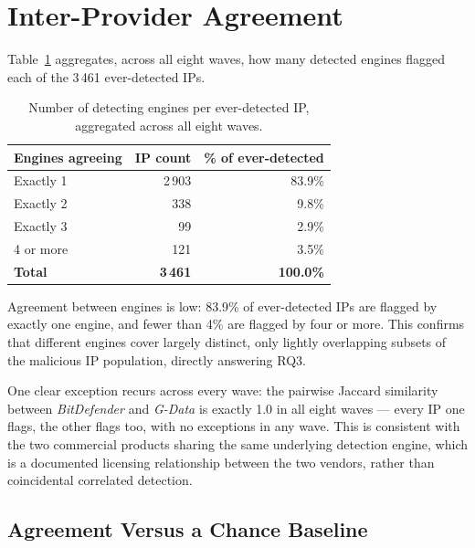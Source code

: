 \documentclass[12pt, a4paper, twoside]{report}
\begin{document}
\section{Inter-Provider Agreement}

Table~\ref{tab:agreement} aggregates, across all eight waves, how many detected engines flagged
each of the 3\,461 ever-detected IPs.

\begin{table}[h]
  \centering
  \caption{Number of detecting engines per ever-detected IP, aggregated across all eight waves.}
  \label{tab:agreement}
  \begin{tabular}{lrr}
    \toprule
    \textbf{Engines agreeing} & \textbf{IP count} & \textbf{\% of ever-detected} \\
    \midrule
    Exactly 1  & 2\,903 & 83.9\% \\
    Exactly 2  & 338    & 9.8\%  \\
    Exactly 3  & 99     & 2.9\%  \\
    4 or more  & 121    & 3.5\%  \\
    \midrule
    \textbf{Total} & \textbf{3\,461} & \textbf{100.0\%} \\
    \bottomrule
  \end{tabular}
\end{table}

Agreement between engines is low: 83.9\% of ever-detected IPs are flagged by exactly one engine,
and fewer than 4\% are flagged by four or more. This confirms that different engines cover largely
distinct, only lightly overlapping subsets of the malicious IP population, directly answering RQ3.

One clear exception recurs across every wave: the pairwise Jaccard similarity between
\emph{BitDefender} and \emph{G-Data} is exactly 1.0 in all eight waves --- every IP one flags, the
other flags too, with no exceptions in any wave. This is consistent with the two commercial
products sharing the same underlying detection engine, which is a documented licensing
relationship between the two vendors, rather than coincidental correlated detection.

\subsection{Agreement Versus a Chance Baseline}
\label{sec:agreement_vs_chance}
\end{document}
